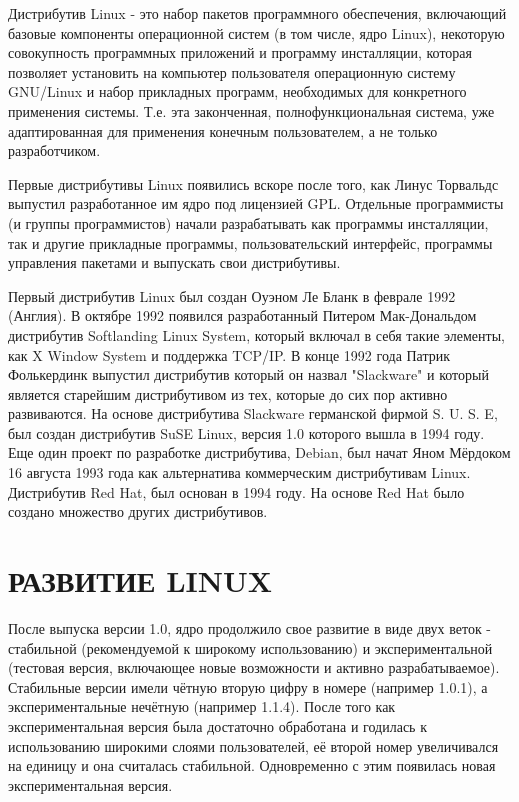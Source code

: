 \documentclass[bachelor, och, referat, times]{SCWorks}
\begin{document}
\par Дистрибутив Linux - это набор пакетов 
программного обеспечения, 
включающий базовые компоненты операционной систем 
(в том числе, ядро 
Linux), некоторую совокупность программных 
приложений и программу 
инсталляции, которая позволяет установить на 
компьютер пользователя 
операционную систему GNU/Linux и набор прикладных 
программ, необходимых 
для конкретного применения системы. Т.е. эта 
законченная, 
полнофункциональная система, уже адаптированная для 
применения конечным 
пользователем, а не только разработчиком.

\par Первые дистрибутивы Linux появились вскоре 
после того, как Линус
Торвальдс выпустил разработанное им ядро под 
лицензией GPL. Отдельные 
программисты (и группы программистов) начали 
разрабатывать как программы 
инсталляции, так и другие прикладные программы, 
пользовательский 
интерфейс, программы управления пакетами и 
выпускать свои дистрибутивы.

\par Первый дистрибутив Linux был создан Оуэном Ле 
Бланк в феврале 1992 
(Англия). В октябре 1992 появился разработанный 
Питером Мак-Дональдом 
дистрибутив Softlanding Linux System, который 
включал в себя такие 
элементы, как X Window System и поддержка TCP/IP. В 
конце 1992 года Патрик
Фолькердинк выпустил дистрибутив который он назвал 
"Slackware" и который 
является старейшим дистрибутивом из тех, которые до 
сих пор активно 
развиваются. На основе дистрибутива Slackware 
германской фирмой S. U. S. 
E, был создан дистрибутив SuSE Linux, версия 1.0 
которого вышла в 1994 
году. Еще один проект по разработке дистрибутива, 
Debian, был начат Яном 
Мёрдоком 16 августа 1993 года как альтернатива 
коммерческим дистрибутивам 
Linux. Дистрибутив Red Hat, был основан в 1994 
году. На основе Red Hat 
было создано множество других дистрибутивов.

\section{РАЗВИТИЕ LINUX}

\par После выпуска версии 1.0, ядро продолжило свое 
развитие в виде двух 
веток - стабильной (рекомендуемой к широкому 
использованию) и 
экспериментальной (тестовая версия, включающее 
новые возможности и активно
разрабатываемое). Стабильные версии имели чётную 
вторую цифру в номере 
(например 1.0.1), а экспериментальные нечётную 
(например 1.1.4). После 
того как экспериментальная версия была достаточно 
обработана и годилась к 
использованию широкими слоями пользователей, её 
второй номер увеличивался 
на единицу и она считалась стабильной. Одновременно 
с этим появилась новая
экспериментальная версия.
\end{document}
